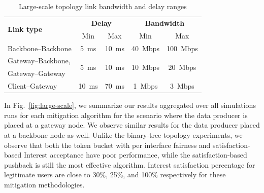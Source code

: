 \documentclass[10pt,conference]{IEEEtran}
\begin{document}
{\begin{table}[t]
\centering
\caption{Large-scale topology link bandwidth and delay ranges}
\label{tab:large-scale}
\begin{tabular}{|l||c|c||c|c|}
  \hline
  \multirow{2}{*}{\bf Link type} &  \multicolumn{2}{|c||}{\bf Delay} &  \multicolumn{2}{|c|}{\bf Bandwidth} \tabularnewline
  \cline{2-5}
                        &  Min & Max                       &  Min & Max \tabularnewline
  \hline \hline
  Backbone--Backbone    & 5~ms & 10~ms   & 40~Mbps & 100~Mbps \tabularnewline
  \hline
  Gateway--Backbone,    & \multirow{2}{*}{5~ms} & \multirow{2}{*}{10~ms}   
                        & \multirow{2}{*}{10~Mbps} & \multirow{2}{*}{20~Mbps} \tabularnewline
  Gateway--Gateway      & & & & \\
  \hline
  Client--Gateway       & 10~ms & 70~ms   & 1~Mbps  & 3~Mbps \\
  \hline
\end{tabular}
\end{table}




In Fig.~\ref{fig:large-scale}, we summarize our results aggregated over all simulations runs for each mitigation algorithm for the scenario where the data producer is placed at a gateway node. We observe similar results for the data producer placed at a backbone node as well. Unlike the binary-tree topology experiments, we observe that 
both the token bucket with per interface fairness and satisfaction-based Interest acceptance have poor performance, while the satisfaction-based pushback is still the most effective algorithm.  Interest satisfaction percentage for legitimate users are close to 30\%, 25\%, and 100\% respectively for these mitigation methodologies.

}
\end{document}
